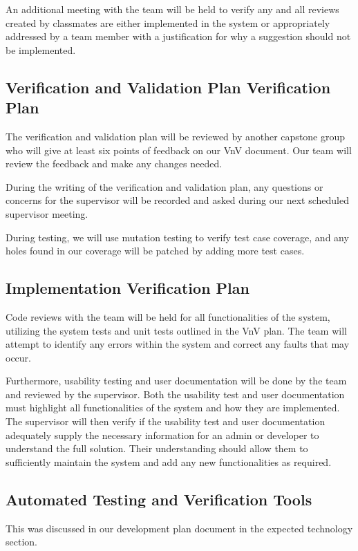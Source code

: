 \documentclass[12pt, titlepage]{article}
\begin{document}
An additional meeting with the team will be held to verify any and all reviews created by
classmates are either implemented in the system or appropriately addressed by a team member
with a justification for why a suggestion should not be implemented.

\subsection{Verification and Validation Plan Verification Plan}

The verification and validation plan will be reviewed by another capstone
group who will give at least six points of feedback on our VnV document. Our
team will review the feedback and make any changes needed. 

During the writing of the verification and validation plan, any questions or
concerns for the supervisor will be recorded and asked during our next
scheduled supervisor meeting.

During testing, we will use mutation testing to verify test case coverage, and
any holes found in our coverage will be patched by adding more test cases.

\subsection{Implementation Verification Plan}

Code reviews with the team will be held for all functionalities of the system, utilizing the
system tests and unit tests outlined in the VnV plan. The team will attempt to identify any
errors within the system and correct any faults that may occur.

Furthermore, usability testing and user documentation will be done by the team and
reviewed by the supervisor. Both the usability test and user documentation must highlight
all functionalities of the system and how they are implemented. The supervisor will then
verify if the usability test and user documentation adequately supply the necessary
information for an admin or developer to understand the full solution. Their understanding
should allow them to sufficiently maintain the system and add any new functionalities as
required.

\subsection{Automated Testing and Verification Tools}

This was discussed in our development plan document \cite{DP} 
in the expected technology section.
\end{document}
